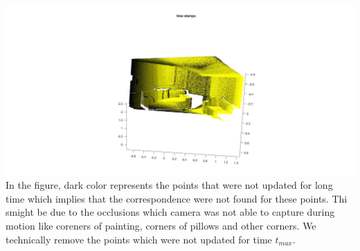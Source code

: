 \documentclass[fleqn]{article}
\begin{document}
\begin{adjustwidth}{4em}{0pt}
	\includegraphics[width = 1.5\textwidth,center]{slam_hw3_q3_partc_timeStamps.jpg}\\
	In the figure, dark color represents the points that were not updated for long time which implies that the correspondence were not found for these points. Thi smight be due to the occlusions which camera was not able to capture during motion like coreners of painting, corners of pillows and other corners. We technically remove the points which were not updated for time $t_{max}$.
\end{adjustwidth}
	
\end{document}
